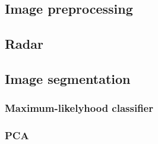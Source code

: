 \subsection{Image preprocessing}
\subsubsection{}
\subsection{Radar}
\subsection{Image segmentation}
\subsubsection{Maximum-likelyhood classifier}
\subsubsection{PCA}

